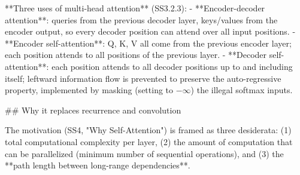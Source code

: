 \documentclass[10pt]{article}
\begin{document}
\begin{AnswerText}
**Three uses of multi-head attention** (SS3.2.3):
- **Encoder-decoder attention**: queries from the previous decoder layer, keys/values from the encoder output, so every decoder position can attend over all input positions.
- **Encoder self-attention**: Q, K, V all come from the previous encoder layer; each position attends to all positions of the previous layer.
- **Decoder self-attention**: each position attends to all decoder positions up to and including itself; leftward information flow is prevented to preserve the auto-regressive property, implemented by masking (setting to $-\infty$) the illegal softmax inputs.

## Why it replaces recurrence and convolution

The motivation (SS4, "Why Self-Attention") is framed as three desiderata: (1) total computational complexity per layer, (2) the amount of computation that can be parallelized (minimum number of sequential operations), and (3) the **path length between long-range dependencies**.


\end{AnswerText}
\end{document}
